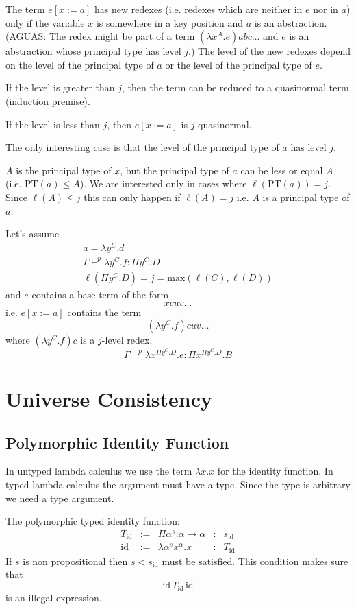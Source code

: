 The term $e[x:=a]$ has new redexes (i.e. redexes which are neither in $e$ nor
in $a$) only if the variable $x$ is somewhere in a key position and $a$ is an
abstraction. (AGUAS: The redex might be part of a term
$(\lambda x^A.e) a b c\ldots$ and $e$ is an abstraction whose principal type
has level $j$.) The level of the new redexes depend on the level of the
principal type of $a$ or the level of the principal type of $e$.

If the level is greater than $j$, then the term can be reduced to a
quasinormal term (induction premise).

If the level is less than $j$, then $e[x:=a]$ is $j$-quasinormal.

The only interesting case is that the level of the principal type of $a$ has
level $j$.


$A$ is the principal type of $x$, but the principal type of $a$ can be less or
equal $A$ (i.e. $\text{PT}(a) \le A$). We are interested only in cases where
$\ell(\text{PT}(a)) = j$. Since $\ell(A) \le j$ this can only happen if
$\ell(A) = j$ i.e. $A$ is a principal type of $a$.



Let's assume
$$
\begin{array}{l}
  a = \lambda y^C.d
  \\
  \Gamma \vdash^p \lambda y^C.f: \Pi y^C.D
  \\
  \ell(\Pi y^C.D) = j = \text{max}(\ell(C), \ell(D))
\end{array}
$$
and $e$ contains a base term of the form
$$
x c u v \ldots
$$
i.e. $e[x:=a]$ contains the term
$$
(\lambda y^C.f) c u v \ldots
$$
where $(\lambda y^C.f) c$ is a $j$-level redex.
$$
\Gamma \vdash^p \lambda x^{\Pi y^C.D}.e : \Pi x^{\Pi y^C.D}. B
$$


\section{Universe Consistency}

\subsection{Polymorphic Identity Function}

In untyped lambda calculus we use the term $\lambda x.x$ for the identity
function. In typed lambda calculus the argument must have a type. Since the
type is arbitrary we need a type argument.

{\def\id{\text{id}}

  The polymorphic typed identity function:
  $$
  \begin{array}{lllll}
    T_\id &:=& \Pi \alpha^s. \alpha \to \alpha &:& s_\id
    \\
    \id &:=& \lambda \alpha^s x^\alpha . x &:& T_\id
  \end{array}
  $$
  If $s$ is non propositional then $s < s_\id$ must be satisfied. This
  condition makes sure that
  $$
  \id \, T_\id \, \id
  $$
  is an illegal expression.
}



